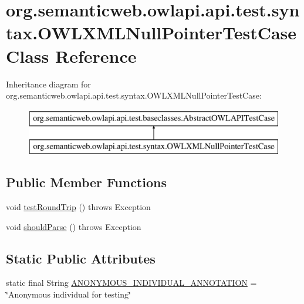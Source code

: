 \hypertarget{classorg_1_1semanticweb_1_1owlapi_1_1api_1_1test_1_1syntax_1_1_o_w_l_x_m_l_null_pointer_test_case}{\section{org.\-semanticweb.\-owlapi.\-api.\-test.\-syntax.\-O\-W\-L\-X\-M\-L\-Null\-Pointer\-Test\-Case Class Reference}
\label{classorg_1_1semanticweb_1_1owlapi_1_1api_1_1test_1_1syntax_1_1_o_w_l_x_m_l_null_pointer_test_case}
}
Inheritance diagram for org.\-semanticweb.\-owlapi.\-api.\-test.\-syntax.\-O\-W\-L\-X\-M\-L\-Null\-Pointer\-Test\-Case\-:\begin{figure}[H]
\begin{center}
\leavevmode
\includegraphics[height=2.000000cm]{classorg_1_1semanticweb_1_1owlapi_1_1api_1_1test_1_1syntax_1_1_o_w_l_x_m_l_null_pointer_test_case}
\end{center}
\end{figure}
\subsection*{Public Member Functions}
\begin{DoxyCompactItemize}
\item 
void \hyperlink{classorg_1_1semanticweb_1_1owlapi_1_1api_1_1test_1_1syntax_1_1_o_w_l_x_m_l_null_pointer_test_case_a3f83f681201ef8054ff629bedf47bff9}{test\-Round\-Trip} ()  throws Exception 
\item 
void \hyperlink{classorg_1_1semanticweb_1_1owlapi_1_1api_1_1test_1_1syntax_1_1_o_w_l_x_m_l_null_pointer_test_case_ad546957bee653e0e0f523e45e683b4fb}{should\-Parse} ()  throws Exception 
\end{DoxyCompactItemize}
\subsection*{Static Public Attributes}
\begin{DoxyCompactItemize}
\item 
static final String \hyperlink{classorg_1_1semanticweb_1_1owlapi_1_1api_1_1test_1_1syntax_1_1_o_w_l_x_m_l_null_pointer_test_case_a19d356ff9de6aaa01f501db44b7ba572}{A\-N\-O\-N\-Y\-M\-O\-U\-S\-\_\-\-I\-N\-D\-I\-V\-I\-D\-U\-A\-L\-\_\-\-A\-N\-N\-O\-T\-A\-T\-I\-O\-N} = \char`\"{}Anonymous individual for testing\char`\"{}
\end{DoxyCompactItemize}
